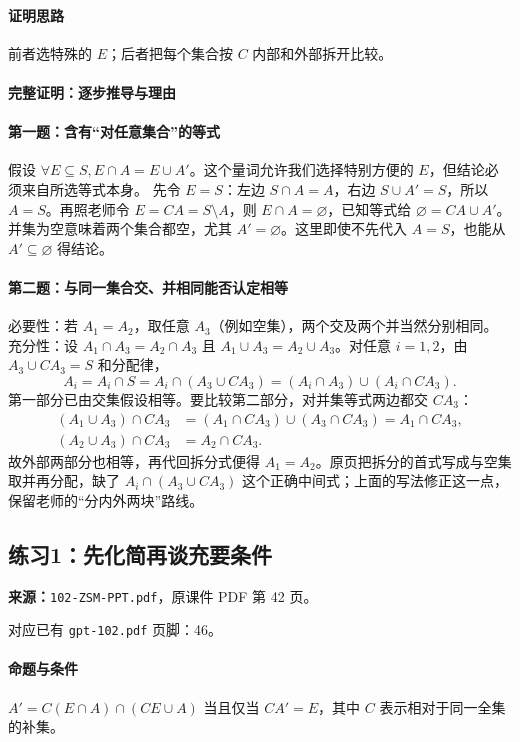 \paragraph{证明思路}前者选特殊的 $E$；后者把每个集合按 $C$ 内部和外部拆开比较。
\paragraph{完整证明：逐步推导与理由}

\paragraph{第一题：含有“对任意集合”的等式}
假设 $\forall E\subseteq S,E\cap A=E\cup A'$。这个量词允许我们选择特别方便的 $E$，但结论必须来自所选等式本身。
先令 $E=S$：左边 $S\cap A=A$，右边 $S\cup A'=S$，所以 $A=S$。再照老师令 $E=CA=S\setminus A$，则 $E\cap A=\varnothing$，已知等式给 $\varnothing=CA\cup A'$。并集为空意味着两个集合都空，尤其 $A'=\varnothing$。这里即使不先代入 $A=S$，也能从 $A'\subseteq\varnothing$ 得结论。
\paragraph{第二题：与同一集合交、并相同能否认定相等}
必要性：若 $A_1=A_2$，取任意 $A_3$（例如空集），两个交及两个并当然分别相同。
充分性：设 $A_1\cap A_3=A_2\cap A_3$ 且 $A_1\cup A_3=A_2\cup A_3$。对任意 $i=1,2$，由 $A_3\cup CA_3=S$ 和分配律，
\[A_i=A_i\cap S=A_i\cap(A_3\cup CA_3)=(A_i\cap A_3)\cup(A_i\cap CA_3).\]
第一部分已由交集假设相等。要比较第二部分，对并集等式两边都交 $CA_3$：
\begin{align*}
(A_1\cup A_3)\cap CA_3&=(A_1\cap CA_3)\cup(A_3\cap CA_3)=A_1\cap CA_3,\\
(A_2\cup A_3)\cap CA_3&=A_2\cap CA_3.
\end{align*}
故外部两部分也相等，再代回拆分式便得 $A_1=A_2$。原页把拆分的首式写成与空集取并再分配，缺了 $A_i\cap(A_3\cup CA_3)$ 这个正确中间式；上面的写法修正这一点，保留老师的“分内外两块”路线。

\clearpage\subsection{练习1：先化简再谈充要条件}
\textbf{来源：}\texttt{102-ZSM-PPT.pdf}，原课件 PDF 第 42 页。\par
对应已有 \texttt{gpt-102.pdf} 页脚：46。\par
\paragraph{命题与条件}$A'=C(E\cap A)\cap(CE\cup A)$ 当且仅当 $CA'=E$，其中 $C$ 表示相对于同一全集的补集。
